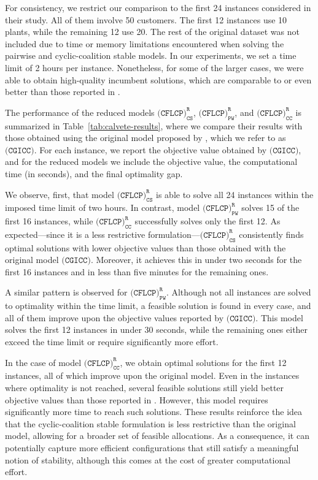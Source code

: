 \documentclass[preprint,11pt,authoryear]{elsarticle}
\begin{document}
For consistency, we restrict our comparison to the first 24 instances considered in their study. All of them involve 50 customers. The first 12 instances use 10 plants, while the remaining 12 use 20. The rest of the original dataset was not included due to time or memory limitations encountered when solving the pairwise and cyclic-coalition stable models. In our experiments, we set a time limit of 2 hours per instance. Nonetheless, for some of the larger cases, we were able to obtain high-quality incumbent solutions, which are comparable to or even better than those reported in \cite{calvete2020}.

The performance of the reduced models $\texttt{(CFLCP)}_{\texttt{CS}}^\texttt{R}$, $\texttt{(CFLCP)}_{\texttt{PW}}^\texttt{R}$, and $\texttt{(CFLCP)}_{\texttt{CC}}^\texttt{R}$ is summarized in Table~\ref{tab:calvete-results}, where we compare their results with those obtained using the original model proposed by \cite{calvete2020}, which we refer to as $\texttt{(CGICC)}$. For each instance, we report the objective value obtained by $\texttt{(CGICC)}$, and for the reduced models we include the objective value, the computational time (in seconds), and the final optimality gap.



We observe, first, that model $\texttt{(CFLCP)}_{\texttt{CS}}^\texttt{R}$ is able to solve all 24 instances within the imposed time limit of two hours. In contrast, model $\texttt{(CFLCP)}_{\texttt{PW}}^\texttt{R}$ solves 15 of the first 16 instances, while $\texttt{(CFLCP)}_{\texttt{CC}}^\texttt{R}$ successfully solves only the first 12. As expected—since it is a less restrictive formulation—$\texttt{(CFLCP)}_{\texttt{CS}}^\texttt{R}$ consistently finds optimal solutions with lower objective values than those obtained with the original model $\texttt{(CGICC)}$. Moreover, it achieves this in under two seconds for the first 16 instances and in less than five minutes for the remaining ones.

A similar pattern is observed for $\texttt{(CFLCP)}_{\texttt{PW}}^\texttt{R}$. Although not all instances are solved to optimality within the time limit, a feasible solution is found in every case, and all of them improve upon the objective values reported by $\texttt{(CGICC)}$. This model solves the first 12 instances in under 30 seconds, while the remaining ones either exceed the time limit or require significantly more effort.

In the case of model $\texttt{(CFLCP)}_{\texttt{CC}}^\texttt{R}$, we obtain optimal solutions for the first 12 instances, all of which improve upon the original model. Even in the instances where optimality is not reached, several feasible solutions still yield better objective values than those reported in \cite{calvete2020}. However, this model requires significantly more time to reach such solutions. These results reinforce the idea that the cyclic-coalition stable formulation is less restrictive than the original model, allowing for a broader set of feasible allocations. As a consequence, it can potentially capture more efficient configurations that still satisfy a meaningful notion of stability, although this comes at the cost of greater computational effort.
\end{document}
